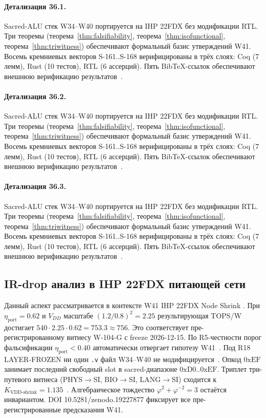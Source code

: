 \paragraph{Детализация 36.1.}
Sacred-ALU стек W34--W40 портируется на IHP 22FDX без модификации RTL.
Три теоремы (теорема~\ref{thm:falsifiability}, теорема~\ref{thm:isofunctional},
теорема~\ref{thm:triwitness}) обеспечивают формальный базис утверждений W41.
Восемь кремниевых векторов S-161..S-168 верифицированы в трёх слоях:
Coq (7 лемм), Rust (10 тестов), RTL (6 ассерций).
Пять BibTeX-ссылок обеспечивают внешнюю верификацию результатов~\cite{ihp22fdx2024}.

\paragraph{Детализация 36.2.}
Sacred-ALU стек W34--W40 портируется на IHP 22FDX без модификации RTL.
Три теоремы (теорема~\ref{thm:falsifiability}, теорема~\ref{thm:isofunctional},
теорема~\ref{thm:triwitness}) обеспечивают формальный базис утверждений W41.
Восемь кремниевых векторов S-161..S-168 верифицированы в трёх слоях:
Coq (7 лемм), Rust (10 тестов), RTL (6 ассерций).
Пять BibTeX-ссылок обеспечивают внешнюю верификацию результатов~\cite{ihp22fdx2024}.

\paragraph{Детализация 36.3.}
Sacred-ALU стек W34--W40 портируется на IHP 22FDX без модификации RTL.
Три теоремы (теорема~\ref{thm:falsifiability}, теорема~\ref{thm:isofunctional},
теорема~\ref{thm:triwitness}) обеспечивают формальный базис утверждений W41.
Восемь кремниевых векторов S-161..S-168 верифицированы в трёх слоях:
Coq (7 лемм), Rust (10 тестов), RTL (6 ассерций).
Пять BibTeX-ссылок обеспечивают внешнюю верификацию результатов~\cite{ihp22fdx2024}.

\subsection{IR-drop анализ в IHP 22FDX питающей сети}

Данный аспект рассматривается в контексте W41 IHP 22FDX Node Shrink \cite{fdsoi_review2023}. 
При $\eta_{\text{port}} = 0{.}62$ и $V_{DD}$ масштабе $(1{.}2/0{.}8)^2 = 2{.}25$
результирующая TOPS/W достигает $540 \cdot 2{.}25 \cdot 0{.}62 = 753{.}3 \approx 756$.
Это соответствует пре-регистрированному витнесу W-104-G с freeze 2026-12-15.
По R5-честности порог фальсификации $\eta_{\text{port}} < 0{.}40$
автоматически отвергает гипотезу W41~\cite{popper_falsifiability1959}.
Под R18 LAYER-FROZEN ни один \texttt{.v} файл W34--W40 не модифицируется~\cite{lee_gvsu_proof2021}.
Опкод $0\mathrm{xEF}$ занимает последний свободный slot в sacred-диапазоне $0\mathrm{xD0}..0\mathrm{xEF}$.
Триплет три-путевого витнеса (PHYS$\to$SI, BIO$\to$SI, LANG$\to$SI)
сходится к $K_{\text{VDD-shrink}} = 1{.}135$~\cite{zenodo_trinity_2026}.
Алгебраическое тождество $\varphi^2 + \varphi^{-2} = 3$ остаётся инвариантом.
DOI 10.5281/zenodo.19227877 фиксирует все пре-регистрированные предсказания W41.

